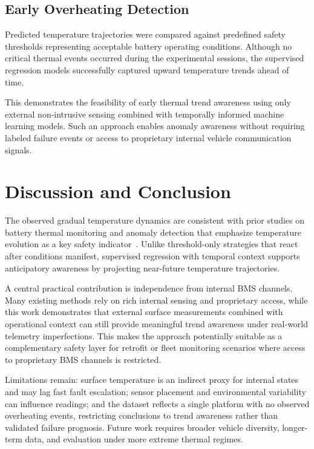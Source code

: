 \documentclass[runningheads]{llncs}
\begin{document}
\subsection{Early Overheating Detection}

Predicted temperature trajectories were compared against predefined safety thresholds representing acceptable battery operating conditions. Although no critical thermal events occurred during the experimental sessions, the supervised regression models successfully captured upward temperature trends ahead of time.

This demonstrates the feasibility of early thermal trend awareness using only external non-intrusive sensing combined with temporally informed machine learning models. Such an approach enables anomaly awareness without requiring labeled failure events or access to proprietary internal vehicle communication signals.

\section{Discussion and Conclusion}
\label{sec:discussion}
The observed gradual temperature dynamics are consistent with prior studies on battery thermal monitoring and anomaly detection that emphasize temperature evolution as a key safety indicator~\cite{feng2018thermal,togun2025comprehensive,yang20196077}. Unlike threshold-only strategies that react after conditions manifest, supervised regression with temporal context supports anticipatory awareness by projecting near-future temperature trajectories.

A central practical contribution is independence from internal BMS channels. Many existing methods rely on rich internal sensing and proprietary access, while this work demonstrates that external surface measurements combined with operational context can still provide meaningful trend awareness under real-world telemetry imperfections. This makes the approach potentially suitable as a complementary safety layer for retrofit or fleet monitoring scenarios where access to proprietary BMS channels is restricted.

Limitations remain: surface temperature is an indirect proxy for internal states and may lag fast fault escalation; sensor placement and environmental variability can influence readings; and the dataset reflects a single platform with no observed overheating events, restricting conclusions to trend awareness rather than validated failure prognosis. Future work requires broader vehicle diversity, longer-term data, and evaluation under more extreme thermal regimes.



\end{document}
